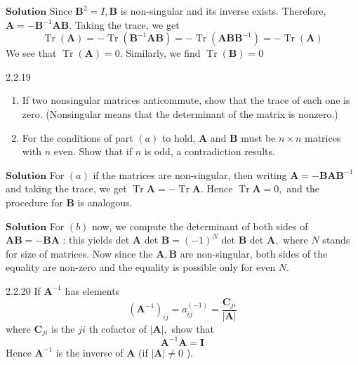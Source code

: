 \documentclass{styles/kaobook}
\begin{document}
$\boxed{\textbf{Solution}}$ Since $\mathbf{B}^{2}=I, \mathbf{B}$ is non-singular and its inverse exists. Therefore, $\mathbf{A}=-\mathbf{B}^{-1} \mathbf{AB}$. Taking the trace, we get
$$
\operatorname{Tr}(\mathbf{A})=-\operatorname{Tr}\left(\mathbf{B}^{-1} \mathbf{AB}\right)=-\operatorname{Tr}\left(\mathbf{ABB}^{-1}\right)=-\operatorname{Tr}(\mathbf{A})
$$
We see that $\operatorname{Tr}(\mathbf{A})=0 .$ Similarly, we find $\operatorname{Tr}(\mathbf{B})=0$






\begin{greenbox}{2.2.19}
\begin{enumerate}[$(a)$]
\item If two nonsingular matrices anticommute, show that the trace of each one is zero.
(Nonsingular means that the determinant of the matrix is nonzero.)
\item For the conditions of part $(a)$ to hold, $\mathbf{A}$ and $\mathbf{B}$ must be $n \times n$ matrices with $n$ even.
Show that if $n$ is odd, a contradiction results.
\end{enumerate}
\end{greenbox}

$\boxed{\textbf{Solution}}$ For $(a)$ if the matrices are non-singular, then writing $\mathbf{A}=-\mathbf{B} \mathbf{A} \mathbf{B}^{-1}$ and taking the trace, we get $\operatorname{Tr} \mathbf{A}=-\operatorname{Tr} \mathbf{A} .$ Hence $\operatorname{Tr} \mathbf{A}=0,$ and the procedure for $\mathbf{B}$ is analogous.


$\boxed{\textbf{Solution}}$ For $(b)$ now, we compute the determinant of both sides of $\mathbf{A} \mathbf{B}=-\mathbf{B} \mathbf{A}$ : this yields det $\mathbf{A}$ det $\mathbf{B}=(-1)^{N}$ det $\mathbf{B}$ det $\mathbf{A},$ where $N$ stands for size of matrices. Now since the $\mathbf{A}, \mathbf{B}$ are non-singular, both sides of the equality are non-zero and the equality is possible only for even $N .$




\begin{greenbox}{2.2.20}
If $\mathbf{A}^{-1}$ has elements
$$
\left(\mathbf{A}^{-1}\right)_{i j}=a_{i j}^{(-1)}=\frac{\mathbf{C}_{j i}}{|\mathbf{A}|}
$$
where $\mathbf{C}_{j i}$ is the $j i$ th cofactor of $|\mathbf{A}|,$ show that
$$
\mathbf{A}^{-1} \mathbf{A}=\mathbf{I}
$$
Hence $\mathbf{A}^{-1}$ is the inverse of $\mathbf{A}$ (if $|\mathbf{A}| \neq 0$ ).
\end{greenbox}
\end{document}
